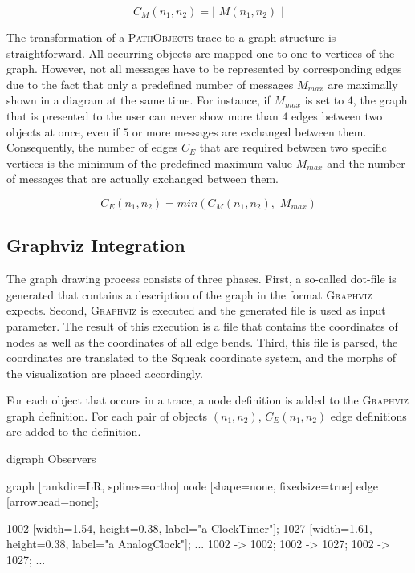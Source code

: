 \begin{equation}
C_M(n_1, n_2) = \left\vert \phantom{i} M(n_1, n_2) \phantom{i} \right\vert
\label{eq:ImplementationGraphMessageCardinality}
\end{equation}

The transformation of a \textsc{PathObjects} trace to a graph structure is straightforward.
All occurring objects are mapped one-to-one to vertices of the graph.
However, not all messages have to be represented by corresponding edges due to the fact that only a predefined number of messages $M_{max}$ are maximally shown in a diagram at the same time.
For instance, if $M_{max}$ is set to $4$, the graph that is presented to the user can never show more than $4$ edges between two objects at once, even if $5$ or more messages are exchanged between them.
Consequently, the number of edges $C_E$ that are required between two specific vertices is the minimum of the predefined maximum value $M_{max}$ and the number of messages that are actually exchanged between them.

\begin{equation}
C_E(n_1, n_2) = min(C_M(n_1, n_2),\phantom{i} M_{max})
\end{equation}

\subsection{Graphviz Integration}

The graph drawing process consists of three phases.
First, a so-called dot-file is generated that contains a description of the graph in the format \textsc{Graphviz} expects.
Second, \textsc{Graphviz} is executed and the generated file is used as input parameter.
The result of this execution is a file that contains the coordinates of nodes as well as the coordinates of all edge bends.
Third, this file is parsed, the coordinates are translated to the Squeak coordinate system, and the morphs of the visualization are placed accordingly.

For each object that occurs in a trace, a node definition is added to the \textsc{Graphviz} graph definition.
For each pair of objects $(n_1, n_2)$, $C_E(n_1, n_2)$ edge definitions are added to the definition.

\begin{graphviz}[caption={Exemplary definition of a \textsc{Graphviz} graph, consisting of two nodes and three directed edges.}, label=lst:ImplementationGraphDot]
digraph Observers {
	graph [rankdir=LR, splines=ortho]
	node [shape=none, fixedsize=true]
	edge [arrowhead=none];
	
	1002 [width=1.54, height=0.38, label="a ClockTimer"];
	1027 [width=1.61, height=0.38, label="a AnalogClock"];
	...
	1002 -> 1002;
	1002 -> 1027;
	1002 -> 1027;
	...
}
\end{graphviz}

